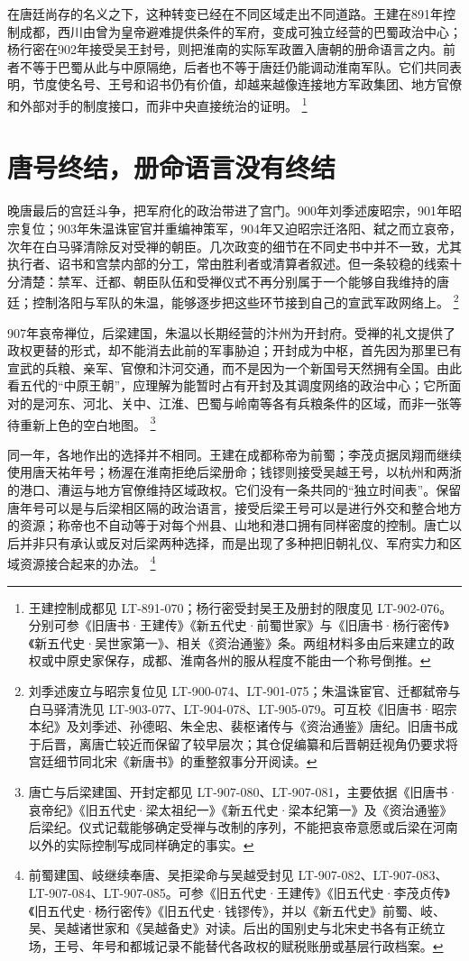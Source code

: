 在唐廷尚存的名义之下，这种转变已经在不同区域走出不同道路。王建在891年控制成都，西川由曾为皇帝避难提供条件的军府，变成可独立经营的巴蜀政治中心；杨行密在902年接受吴王封号，则把淮南的实际军政置入唐朝的册命语言之内。前者不等于巴蜀从此与中原隔绝，后者也不等于唐廷仍能调动淮南军队。它们共同表明，节度使名号、王号和诏书仍有价值，却越来越像连接地方军政集团、地方官僚和外部对手的制度接口，而非中央直接统治的证明。%
\footnote{王建控制成都见 LT-891-070；杨行密受封吴王及册封的限度见 LT-902-076。分别可参《旧唐书·王建传》《新五代史·前蜀世家》与《旧唐书·杨行密传》《新五代史·吴世家第一》、相关《资治通鉴》条。两组材料多由后来建立的政权或中原史家保存，成都、淮南各州的服从程度不能由一个称号倒推。}

\section{唐号终结，册命语言没有终结}

晚唐最后的宫廷斗争，把军府化的政治带进了宫门。900年刘季述废昭宗，901年昭宗复位；903年朱温诛宦官并重编神策军，904年又迫昭宗迁洛阳、弑之而立哀帝，次年在白马驿清除反对受禅的朝臣。几次政变的细节在不同史书中并不一致，尤其执行者、诏书和宫禁内部的分工，常由胜利者或清算者叙述。但一条较稳的线索十分清楚：禁军、迁都、朝臣队伍和受禅仪式不再分别属于一个能够自我维持的唐廷；控制洛阳与军队的朱温，能够逐步把这些环节接到自己的宣武军政网络上。%
\footnote{刘季述废立与昭宗复位见 LT-900-074、LT-901-075；朱温诛宦官、迁都弑帝与白马驿清洗见 LT-903-077、LT-904-078、LT-905-079。可互校《旧唐书·昭宗本纪》及刘季述、孙德昭、朱全忠、裴枢诸传与《资治通鉴》唐纪。旧唐书成于后晋，离唐亡较近而保留了较早层次；其仓促编纂和后晋朝廷视角仍要求将宫廷细节同北宋《新唐书》的重整叙事分开阅读。}

907年哀帝禅位，后梁建国，朱温以长期经营的汴州为开封府。受禅的礼文提供了政权更替的形式，却不能消去此前的军事胁迫；开封成为中枢，首先因为那里已有宣武的兵粮、亲军、官僚和汴河交通，而不是因为一个新国号天然拥有全国。由此看五代的“中原王朝”，应理解为能暂时占有开封及其调度网络的政治中心；它所面对的是河东、河北、关中、江淮、巴蜀与岭南等各有兵粮条件的区域，而非一张等待重新上色的空白地图。%
\footnote{唐亡与后梁建国、开封定都见 LT-907-080、LT-907-081，主要依据《旧唐书·哀帝纪》《旧五代史·梁太祖纪一》《新五代史·梁本纪第一》及《资治通鉴》后梁纪。仪式记载能够确定受禅与改制的序列，不能把哀帝意愿或后梁在河南以外的实际控制写成同样确定的事实。}

同一年，各地作出的选择并不相同。王建在成都称帝为前蜀；李茂贞据凤翔而继续使用唐天祐年号；杨渥在淮南拒绝后梁册命；钱镠则接受吴越王号，以杭州和两浙的港口、漕运与地方官僚维持区域政权。它们没有一条共同的“独立时间表”。保留唐年号可以是与后梁相区隔的政治语言，接受后梁王号可以是进行外交和整合地方的资源；称帝也不自动等于对每个州县、山地和港口拥有同样密度的控制。唐亡以后并非只有承认或反对后梁两种选择，而是出现了多种把旧朝礼仪、军府实力和区域资源接合起来的办法。%
\footnote{前蜀建国、岐继续奉唐、吴拒梁命与吴越受封见 LT-907-082、LT-907-083、LT-907-084、LT-907-085。可参《旧五代史·王建传》《旧五代史·李茂贞传》《旧五代史·杨行密传》《旧五代史·钱镠传》，并以《新五代史》前蜀、岐、吴、吴越诸世家和《吴越备史》对读。后出的国别史与北宋史书各有正统立场，王号、年号和都城记录不能替代各政权的赋税账册或基层行政档案。}

